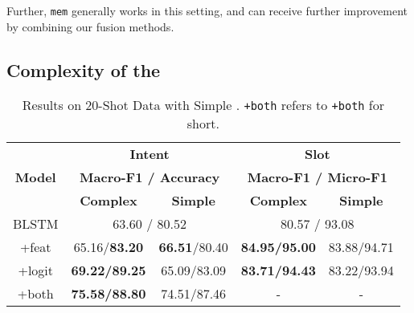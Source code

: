 Further, \texttt{mem} generally works in this setting, and can receive further improvement
by combining our fusion methods.

\subsection{Complexity of the \RE}
\label{sec_complexity}
\begin{table}
\setlength{\tabcolsep}{0.23em}
\centering
\small{
\begin{tabular}{|c|c|c|c|c|}

\hline
\multirow{3}{*}{\textbf{Model}}  & \multicolumn{2}{|c|}{\textbf{Intent}} & \multicolumn{2}{|c|}{\textbf{Slot}}  \\
\cline{2-5}
  & \multicolumn{2}{|c|}{\textbf{Macro-F1 / Accuracy}} & \multicolumn{2}{|c|}{\textbf{Macro-F1 / Micro-F1}}  \\
\cline{2-5}
  & \textbf{Complex} & \textbf{Simple} & \textbf{Complex} & \textbf{Simple} \\
\hline
\rowcolor{Gray} BLSTM & \multicolumn{2}{|c|}{63.60 / 80.52} & \multicolumn{2}{|c|}{80.57 / 93.08}  \\
\hline
+feat & 65.16/\textbf{83.20} & \textbf{66.51}/80.40 & \textbf{84.95/95.00} & 83.88/94.71 \\
\hline
\rowcolor{Gray} +logit & \textbf{69.22/89.25} & 65.09/83.09 & \textbf{83.71/94.43} & 83.22/93.94  \\
\hline
+both & \textbf{75.58/88.80} & 74.51/87.46 & - & - \\
\hline
\end{tabular}
}
\caption{Results on 20-Shot Data with Simple \REs. \texttt{+both} refers to \ptatt\texttt{+both} for short.}
\label{tab_simple}
\end{table}

